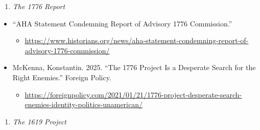 \documentclass[]{tufte-handout}
\providecommand{\tightlist}{%
  \setlength{\itemsep}{0pt}\setlength{\parskip}{0pt}}
\begin{document}
\begin{enumerate}
\def\labelenumi{\arabic{enumi}.}
\tightlist
\item
  \emph{The 1776 Report}
\end{enumerate}

\begin{itemize}
\tightlist
\item
  ``AHA Statement Condemning Report of Advisory 1776 Commission.''

  \begin{itemize}
  \tightlist
  \item
    \url{https://www.historians.org/news/aha-statement-condemning-report-of-advisory-1776-commission/}
  \end{itemize}
\item
  McKenna, Konstantin. 2025. ``The 1776 Project Is a Desperate Search
  for the Right Enemies.'' Foreign Policy.

  \begin{itemize}
  \tightlist
  \item
    \url{https://foreignpolicy.com/2021/01/21/1776-project-desperate-search-enemies-identity-politics-unamerican/}
  \end{itemize}
\end{itemize}

\begin{enumerate}
\def\labelenumi{\arabic{enumi}.}
\setcounter{enumi}{1}
\tightlist
\item
  \emph{The 1619 Project}
\end{enumerate}
\end{document}
